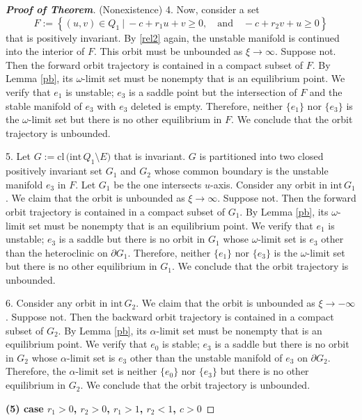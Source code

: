 \documentclass{amsart}
\theoremstyle{definition}
\numberwithin{equation}{section}
\def\ii{{\textrm{int}}\,}
\def\cl{{\textrm{cl}}\,}
\begin{document}
\begin{proof}[\textbf{Proof of Theorem}]
(Nonexistence) 4. Now, consider a set $$F:= \left\{ (u,v)\in Q_1 ~|~ -c+r_1 u + v \ge 0, \quad \text{and} \quad -c + r_2v +u \ge 0\right\}$$ that is positively invariant. By \eqref{rel2} again, the unstable manifold is continued into the interior of $F$. This orbit must be unbounded as $\xi \rightarrow \infty.$ Suppose not. Then the forward orbit trajectory is contained in a compact subset of $F$. By Lemma \ref{pb}, its $\omega$-limit set must be nonempty that is an equilibrium point. We verify that $e_1$ is unstable; $e_3$ is a saddle point but the intersection of $F$ and the stable manifold of $e_3$ with $e_3$ deleted is empty. Therefore, neither $\{e_1\}$ nor $\{e_3\}$ is the $\omega$-limit set  but there is no other equilibrium in $F$. We conclude that the orbit trajectory is unbounded.

5. Let $G:= \cl\big(\ii Q_1 \setminus E\big)$ that is invariant. $G$ is partitioned into two closed positively invariant set $G_1$ and $G_2$ whose common boundary is the unstable manifold $e_3$ in $F$. Let $G_1$ be the one intersects $u$-axis. Consider any orbit in $\ii G_1$. We claim that the orbit is unbounded as $\xi \rightarrow \infty$. Suppose not. Then the forward orbit trajectory is contained in a compact subset of $G_1$. By Lemma \ref{pb}, its $\omega$-limit set must be nonempty that is an equilibrium point. We verify that $e_1$ is unstable; $e_3$ is a saddle but there is no orbit in $G_1$ whose $\omega$-limit set is $e_3$ other than the heteroclinic on $\partial G_1$. Therefore, neither $\{e_1\}$ nor $\{e_3\}$ is the $\omega$-limit set but there is no other equilibrium in $G_1$. We conclude that the orbit trajectory is unbounded. 

6. Consider any orbit in $\ii G_2$. We claim that the orbit is unbounded as $\xi \rightarrow -\infty$. Suppose not. Then the backward orbit trajectory is contained in a compact subset of $G_2$. By Lemma \ref{pb}, its $\alpha$-limit set must be nonempty that is an equilibrium point. We verify that $e_0$ is stable; $e_3$ is a saddle but there is no orbit in $G_2$ whose $\alpha$-limit set is $e_3$ other than the unstable manifold of $e_3$ on $\partial G_2$. Therefore, the $\alpha$-limit set is neither $\{e_0\}$ nor $\{e_3\}$ but there is no other equilibrium in $G_2$. We conclude that the orbit trajectory is unbounded. 
\bigskip

\textbf{(5) \boldmath case $r_1>0$, $r_2>0$, $r_1 >1$, $r_2<1$, $c>0$}


\end{proof}
\end{document}
